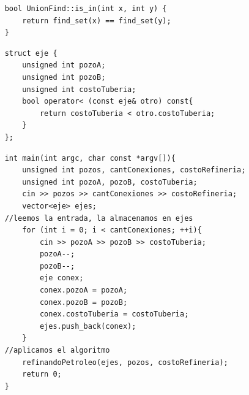 	\begin{codesnippet}
	\begin{verbatim}
    bool UnionFind::is_in(int x, int y) {
        return find_set(x) == find_set(y);
    }
	\end{verbatim}
	\end{codesnippet}

	\begin{codesnippet}
	\begin{verbatim}
    struct eje {
        unsigned int pozoA;
        unsigned int pozoB;
        unsigned int costoTuberia;
        bool operator< (const eje& otro) const{
            return costoTuberia < otro.costoTuberia;
        }
    };
	\end{verbatim}
	\end{codesnippet}

	\begin{codesnippet}
	\begin{verbatim}
    int main(int argc, char const *argv[]){
        unsigned int pozos, cantConexiones, costoRefineria;
        unsigned int pozoA, pozoB, costoTuberia;
        cin >> pozos >> cantConexiones >> costoRefineria;
        vector<eje> ejes;
    //leemos la entrada, la almacenamos en ejes
        for (int i = 0; i < cantConexiones; ++i){
            cin >> pozoA >> pozoB >> costoTuberia;
            pozoA--;
            pozoB--;
            eje conex;
            conex.pozoA = pozoA;
            conex.pozoB = pozoB;
            conex.costoTuberia = costoTuberia;
            ejes.push_back(conex);
        }
    //aplicamos el algoritmo
        refinandoPetroleo(ejes, pozos, costoRefineria);
        return 0;
    }
	\end{verbatim}
	\end{codesnippet}

